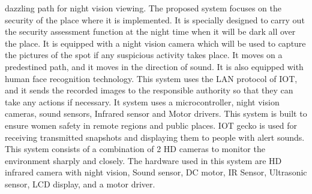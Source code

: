 \documentclass[journal]{IEEEtran}
\begin{document}
dazzling path for night vision viewing.\cite{[12]}
The proposed system focuses on the security of the place
where it is implemented. It is specially designed to
carry out the security assessment function at the night
time when it will be dark all over the place. It is equipped
with a night vision camera which will be used to capture
the pictures of the spot if any suspicious activity takes
place. It moves on a predestined path, and it moves in
the direction of sound. It is also equipped with human
face recognition technology. This system uses the LAN
protocol of IOT, and it sends the recorded images to the
responsible authority so that they can take any actions
if necessary. It system uses a microcontroller, night
vision cameras, sound sensors, Infrared sensor and Motor
drivers.\cite{[15]}
This system is built to ensure women safety in remote
regions and public places. IOT gecko is used for
receiving transmitted snapshots and displaying them to
people with alert sounds. This system consists of a
combination of 2 HD cameras to monitor the environment
sharply and closely. The hardware used in this system are
HD infrared camera with night vision, Sound sensor,
DC motor, IR Sensor, Ultrasonic sensor, LCD display, and
a motor driver.\cite{[16]}
\end{document}
